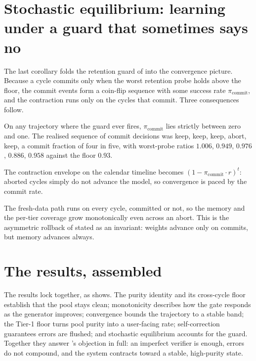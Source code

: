 \section{Stochastic equilibrium: learning under a guard that sometimes says no}
\label{sec:theory-equilibrium}

The last corollary folds the retention guard of  into the convergence picture.
Because a cycle commits only when the worst retention probe holds above the floor, the commit
events form a coin-flip sequence with some success rate $\pi_{\text{commit}}$, and the
contraction runs only on the cycles that commit. Three consequences follow.

\begin{description}[leftmargin=0pt, labelsep=0.5em, style=nextline]
  \item[The commit rate is a real fraction.] On any trajectory where the guard ever fires,
  $\pi_{\text{commit}}$ lies strictly between zero and one. The realised sequence of commit
  decisions was keep, keep, keep, abort, keep, a commit fraction of four in five, with
  worst-probe ratios $1.006$, $0.949$, $0.976$, $0.886$, $0.958$ against the floor $0.93$.
  \item[Calendar progress slows, but does not stop.] The contraction envelope on the calendar
  timeline becomes $(1 - \pi_{\text{commit}}\cdot r)^t$: aborted cycles simply do not advance
  the model, so convergence is paced by the commit rate.
  \item[Memory grows regardless.] The fresh-data path runs on every cycle, committed or not,
  so the memory and the per-tier coverage grow monotonically even across an abort. This is the
  asymmetric rollback of  stated as an invariant: weights advance only on commits,
  but memory advances always.
\end{description}

\section{The results, assembled}
\label{sec:theory-map}

The results lock together, as  shows. The purity identity and its
cross-cycle floor establish that the pool stays clean; monotonicity describes how the gate
responds as the generator improves; convergence bounds the trajectory to a stable band;
the Tier-1 floor turns pool purity into a user-facing rate; self-correction guarantees errors
are flushed; and stochastic equilibrium accounts for the guard. Together they answer
's objection in full: an imperfect verifier is enough, errors do not
compound, and the system contracts toward a stable, high-purity state.

